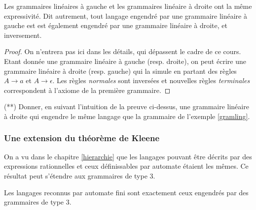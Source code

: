 \begin{lemma}
Les grammaires linéaires à gauche et les grammaires linéaire à droite ont la même expressivité. Dit autrement, tout langage engendré par une grammaire linéaire à gauche est est également engendré par une grammaire linéaire à droite, et inversement.
\end{lemma}

\begin{proof}
On n'entrera pas ici dans les détails, qui dépassent le cadre de ce cours. Etant donnée une grammaire linéaire à gauche (resp. droite), on peut écrire une grammaire linéaire à droite (resp. gauche) qui la simule en partant des règles $A \rightarrow a$ et $A \rightarrow \epsilon$. Les règles \textit{normales} sont inversées et nouvelles règles \textit{terminales} correspondent à l'axiome de la première grammaire. 
\end{proof}

\begin{exercice}(**) Donner, en suivant l'intuition de la preuve ci-dessus, une grammaire linéaire à droite qui engendre le même langage que la grammaire de l'exemple \ref{gramling}.
\end{exercice}

\subsubsection{Une extension du théorème de Kleene}
\label{kleeneplusplus}
On a vu dans le chapitre \ref{hierarchie} que les langages pouvant être décrits par des expressions rationnelles et ceux définissables par automate étaient les mêmes. Ce résultat peut s'étendre aux grammaires de type 3.

\begin{theorem}
Les langages reconnus par automate fini sont exactement ceux engendrés par des grammaires de type 3.
\end{theorem}

